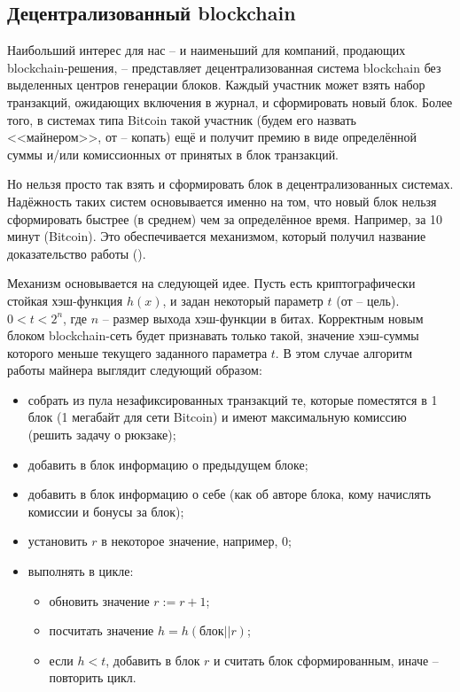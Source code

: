 \subsection{Децентрализованный blockchain}

Наибольший интерес для нас -- и наименьший для компаний, продающих blockchain-решения, -- представляет децентрализованная система blockchain без выделенных центров генерации блоков. Каждый участник может взять набор транзакций, ожидающих включения в журнал, и сформировать новый блок. Более того, в системах типа Bitсoin такой участник (будем его назвать <<майнером>>, от  -- копать) ещё и получит премию в виде определённой суммы и/или комиссионных от принятых в блок транзакций.

Но нельзя просто так взять и сформировать блок в децентрализованных системах. Надёжность таких систем основывается именно на том, что новый блок нельзя сформировать быстрее (в среднем) чем за определённое время. Например, за 10 минут (Bitcoin). Это обеспечивается механизмом, который получил название доказательство работы ().

Механизм основывается на следующей идее. Пусть есть криптографически стойкая хэш-функция $h(x)$, и задан некоторый параметр $t$ (от  -- цель). $0 < t < 2^{n}$, где $n$ -- размер выхода хэш-функции в битах. Корректным новым блоком blockchain-сеть будет признавать только такой, значение хэш-суммы которого меньше текущего заданного параметра $t$. В этом случае алгоритм работы майнера выглядит следующий образом:
\begin{itemize}
	\item собрать из пула незафиксированных транзакций те, которые поместятся в 1 блок (1 мегабайт для сети Bitcoin) и имеют максимальную комиссию (решить задачу о рюкзаке);
	\item добавить в блок информацию о предыдущем блоке;
	\item добавить в блок информацию о себе (как об авторе блока, кому начислять комиссии и бонусы за блок);
	\item установить $r$ в некоторое значение, например, $0$;
	\item выполнять в цикле:
	\begin{itemize}
		\item обновить значение $r := r + 1$;
		\item посчитать значение $h = h( \text{блок} || r)$;
		\item если $h < t$, добавить в блок $r$ и считать блок сформированным, иначе -- повторить цикл.
	\end{itemize}
\end{itemize}

